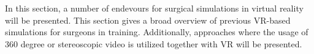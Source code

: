 In this section, a number of endevours for surgical simulations in virtual reality will be presented.
This section gives a broad overview of previous VR-based simulations for surgeons in training.
Additionally, approaches where the usage of 360 degree or stereoscopic video is utilized together with VR will be presented.